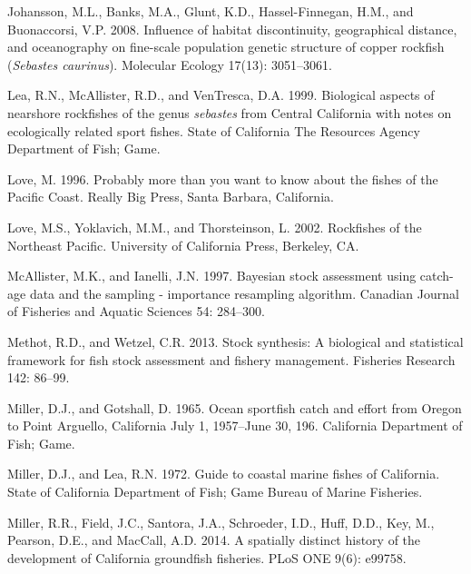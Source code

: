 \documentclass[11pt,
  english,
  a4paper,
]{article}
\newlength{\cslhangindent}
\newenvironment{CSLReferences}[2] %
 {%
  \setlength{\parindent}{0pt}
  \ifodd #1 \everypar{\setlength{\hangindent}{\cslhangindent}}\ignorespaces\fi
  \ifnum #2 > 0
  \setlength{\parskip}{#2\baselineskip}
  \fi
 }%
 {}
\begin{document}
\begin{CSLReferences}{1}{0}
\leavevmode{}%
Johansson, M.L., Banks, M.A., Glunt, K.D., Hassel-Finnegan, H.M., and Buonaccorsi, V.P. 2008. Influence of habitat discontinuity, geographical distance, and oceanography on fine-scale population genetic structure of copper rockfish (\emph{{Sebastes} caurinus}). Molecular Ecology 17(13): 3051--3061.

\leavevmode{}%
Lea, R.N., McAllister, R.D., and VenTresca, D.A. 1999. Biological aspects of nearshore rockfishes of the genus \emph{sebastes} from {Central} {California} with notes on ecologically related sport fishes. State of California The Resources Agency Department of Fish; Game.

\leavevmode{}%
Love, M. 1996. Probably more than you want to know about the fishes of the {Pacific} {Coast}. Really Big Press, Santa Barbara, California.

\leavevmode{}%
Love, M.S., Yoklavich, M.M., and Thorsteinson, L. 2002. Rockfishes of the {Northeast} {Pacific}. University of California Press, Berkeley, CA.

\leavevmode{}%
McAllister, M.K., and Ianelli, J.N. 1997. Bayesian stock assessment using catch-age data and the sampling - importance resampling algorithm. Canadian Journal of Fisheries and Aquatic Sciences 54: 284--300.

\leavevmode{}%
Methot, R.D., and Wetzel, C.R. 2013. Stock synthesis: A biological and statistical framework for fish stock assessment and fishery management. Fisheries Research 142: 86--99.

\leavevmode{}%
Miller, D.J., and Gotshall, D. 1965. Ocean sportfish catch and effort from {Oregon} to {Point} {Arguello}, {California} {July} 1, 1957--{June} 30, 196. California Department of Fish; Game.

\leavevmode{}%
Miller, D.J., and Lea, R.N. 1972. Guide to coastal marine fishes of {California}. State of California Department of Fish; Game Bureau of Marine Fisheries.

\leavevmode{}%
Miller, R.R., Field, J.C., Santora, J.A., Schroeder, I.D., Huff, D.D., Key, M., Pearson, D.E., and MacCall, A.D. 2014. A spatially distinct history of the development of {California} groundfish fisheries. PLoS ONE 9(6): e99758.


\end{CSLReferences}
\end{document}
